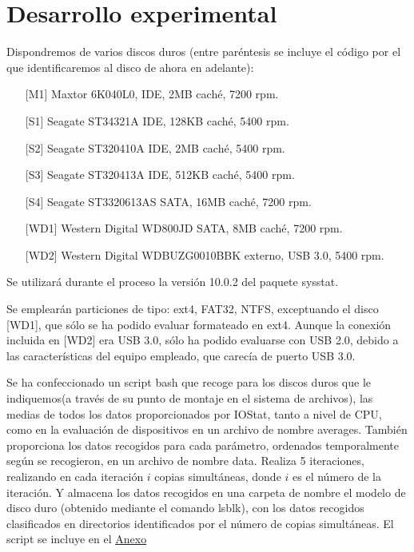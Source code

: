 \documentclass[a4paper,10pt]{article}
\renewcommand{\texttt}[2][black!60]{\textcolor{#1}{\ttfamily #2}}
\begin{document}
 \section{Desarrollo experimental}
Dispondremos de varios discos duros (entre paréntesis se incluye el código por el que identificaremos al disco
de ahora en adelante): \label{discos}
\begin{itemize}
 \item [][M1] Maxtor 6K040L0, IDE, 2MB caché, 7200 rpm.
 \item [][S1] Seagate ST34321A IDE, 128KB caché, 5400 rpm.
 \item [][S2] Seagate ST320410A IDE, 2MB caché, 5400 rpm. 
 \item [][S3] Seagate ST320413A IDE, 512KB caché, 5400 rpm.
 \item [][S4] Seagate ST3320613AS SATA, 16MB caché, 7200 rpm. 
 \item [][WD1] Western Digital WD800JD SATA, 8MB caché, 7200 rpm.
 \item [][WD2] Western Digital WDBUZG0010BBK externo, USB 3.0, 5400 rpm.
\end{itemize}

Se utilizará durante el proceso la versión 10.0.2 del paquete \texttt{sysstat}.

Se emplearán particiones de tipo: ext4, FAT32, NTFS, exceptuando el disco [WD1], que sólo se ha podido evaluar
formateado en ext4. Aunque la conexión incluida en [WD2] era USB 3.0, sólo ha podido evaluarse con USB 2.0, debido
a las características del equipo empleado, que carecía de puerto USB 3.0.

Se ha confeccionado un script \texttt{bash} que recoge para los discos duros que le indiquemos(a través de su punto de montaje
en el sistema de archivos), las medias de todos los datos proporcionados por IOStat, tanto a nivel de CPU, como
en la evaluación de dispositivos en un archivo de nombre \texttt{averages}. También proporciona los datos recogidos
para cada parámetro, ordenados temporalmente según se recogieron, en un archivo de nombre \texttt{data}. Realiza 
5 iteraciones, realizando en cada iteración $i$ copias simultáneas, donde $i$ es el número de la iteración. Y almacena
los datos recogidos en una carpeta de nombre el modelo de disco duro (obtenido mediante el comando \texttt{lsblk}), con
los datos recogidos clasificados en directorios identificados por el número de copias simultáneas. El script se incluye en el
\hyperlink{script}{Anexo}
\end{document}
